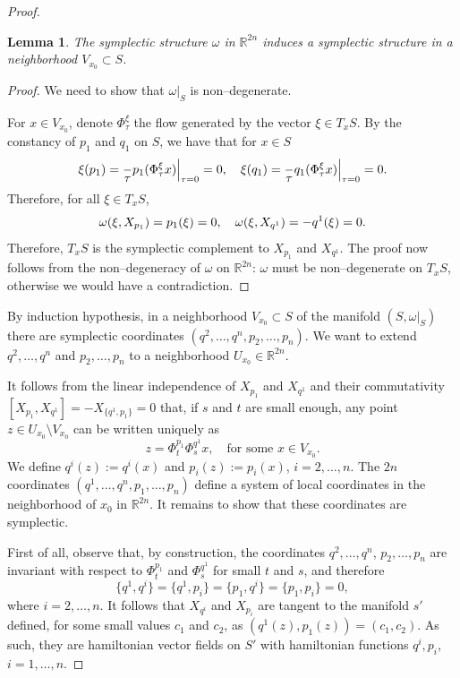 \documentclass[english,fontsize=11pt,paper=a5,oneside]{scrbook}
\newcommand{\R}{\mathbb{R}}
\let\d\relax
\DeclareMathOperator{\d}{d}
\newtheorem{lemma}[theorem]{Lemma}
\theoremstyle{definition}
\begin{document}
\begin{proof}
    \begin{lemma}
        The symplectic structure $\omega$ in $\R^{2n}$ induces a symplectic structure in a neighborhood $V_{x_0}\subset S$.
    \end{lemma}
    \begin{proof}
        We need to show that $\omega|_S$ is non--degenerate.

        For $x\in V_{x_0}$, denote $\Phi_\tau^\xi$ the flow generated by the vector $\xi\in T_x S$.
        By the constancy of $p_1$ and $q_1$ on $S$, we have that for $x\in S$
        \begin{equation}
            \xi(p_1) = \frac{\d}{\d\tau} p_1(\Phi_\tau^\xi x)\Big|_{\tau=0} = 0, \quad
            \xi(q_1) = \frac{\d}{\d\tau} q_1(\Phi_\tau^\xi x)\Big|_{\tau=0} = 0.
        \end{equation}
        Therefore, for all $\xi \in T_x S$, 
        \begin{equation}
            \omega(\xi, X_{p_1}) = \d p_1(\xi) = 0,\quad
            \omega(\xi, X_{q^1}) = -\d q^1(\xi) = 0.
        \end{equation}
        Therefore, $T_x S$ is the symplectic complement to $X_{p_1}$ and $X_{q^1}$.
        The proof now follows from the non--degeneracy of $\omega$ on $\R^{2n}$: $\omega$ must be non--degenerate on $T_x S$, otherwise we would have a contradiction.
    \end{proof}

    By induction hypothesis, in a neighborhood $V_{x_0}\subset S$ of the manifold $(S, \omega|_S)$ there are symplectic coordinates $(q^2, \ldots, q^n, p_2, \ldots, p_n)$. We want to extend $q^2, \ldots, q^n$ and $p_2, \ldots, p_n$ to a neighborhood $U_{x_0}\in\R^{2n}$.

    It follows from the linear independence of $X_{p_1}$ and $X_{q^1}$ and their commutativity $[X_{p_1}, X_{q^1}] = -X_{\big\{q^1,p_1\big\}} = 0$ that, if $s$ and $t$ are small enough, any point $z\in U_{x_0}\setminus V_{x_0}$ can be written uniquely as
    \begin{equation}
        z = \Phi_t^{p_1}\Phi_s^{q^1} x, \quad\mbox{for some }x\in V_{x_0}.
    \end{equation}
    We define $q^i(z) := q^i(x)$ and $p_i(z) := p_i(x)$, $i=2,\ldots,n$.
    The $2n$ coordinates $(q^1, \ldots, q^n, p_1, \ldots, p_n)$ define a system of local coordinates in the neighborhood of $x_0$ in $\R^{2n}$. It remains to show that these coordinates are symplectic.

    First of all, observe that, by construction, the coordinates $q^2, \ldots, q^n$, $p_2, \ldots, p_n$ are invariant with respect to $\Phi_t^{p_1}$ and $\Phi_s^{q^1}$ for small $t$ and $s$, and therefore
    \begin{equation}
        \big\{q^1, q^i\big\} = \big\{q^1, p_i\big\} = \big\{p_1, q^i\big\} = \big\{p_1, p_i\big\} = 0,
    \end{equation}
    where $i = 2,\ldots,n$.
    It follows that $X_{q^i}$ and $X_{p_i}$ are tangent to the manifold $s'$ defined, for some small values $c_1$ and $c_2$, as $(q^1(z), p_1(z)) = (c_1, c_2)$.
    As such, they are hamiltonian vector fields on $S'$ with hamiltonian functions $q^i, p_i$, $i=1,\ldots,n$.


\end{proof}
\end{document}
